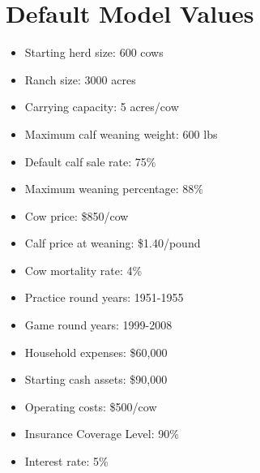 \documentclass[11pt]{article}
\begin{document}
\section{Default Model Values}

\begin{itemize}
\item Starting herd size: 600 cows
\item Ranch size: 3000 acres
\item Carrying capacity: 5 acres/cow
\item Maximum calf weaning weight: 600 lbs
\item Default calf sale rate: 75\%
\item Maximum weaning percentage: 88\%
\item Cow price: \$850/cow
\item Calf price at weaning: \$1.40/pound
\item Cow mortality rate: 4\%
\item Practice round years: 1951-1955
\item Game round years: 1999-2008
\item Household expenses: \$60,000
\item Starting cash assets: \$90,000
\item Operating costs: \$500/cow
\item Insurance Coverage Level: 90\%
\item Interest rate: 5\%
\end{itemize}



  


 
\end{document}
